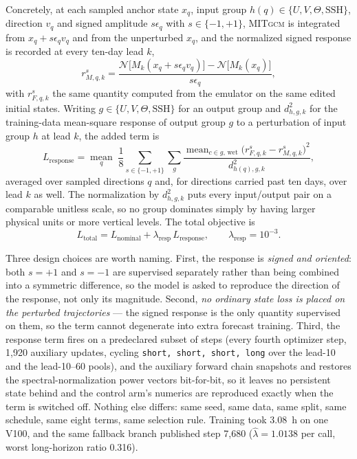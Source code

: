 \documentclass[3p,12pt]{elsarticle}
\newcommand{\MITgcm}{\textsc{MITgcm}}
\begin{document}
Concretely, at each sampled anchor state $x_q$, input group
$h(q)\in\{U,V,\Theta,\mathrm{SSH}\}$, direction $v_q$ and signed amplitude
$s\epsilon_q$ with $s\in\{-1,+1\}$, \MITgcm{} is integrated from
$x_q+s\epsilon_q v_q$ and from the unperturbed $x_q$, and the normalized signed
response is recorded at every ten-day lead $k$,
\begin{equation}
r^{s}_{M,q,k}
=\frac{\mathcal N\bigl[M_k(x_q+s\epsilon_q v_q)\bigr]-\mathcal N\bigl[M_k(x_q)\bigr]}{s\epsilon_q},
\label{eq:response}
\end{equation}
with $r^{s}_{F,q,k}$ the same quantity computed from the emulator on the same
edited initial states. Writing $g\in\{U,V,\Theta,\mathrm{SSH}\}$ for an output
group and $d^{2}_{h,g,k}$ for the training-data mean-square response of output
group $g$ to a perturbation of input group $h$ at lead $k$, the added term is
\begin{equation}
L_{\mathrm{response}}
=\operatorname*{mean}_{q}\;\frac{1}{8}\sum_{s\in\{-1,+1\}}\sum_{g}
\frac{\operatorname{mean}_{c\in g,\,\mathrm{wet}}\bigl(r^{s}_{F,q,k}-r^{s}_{M,q,k}\bigr)^{2}}
{d^{2}_{h(q),g,k}},
\label{eq:lresp}
\end{equation}
averaged over sampled directions $q$ and, for directions carried past ten days,
over lead $k$ as well. The normalization by $d^{2}_{h,g,k}$ puts every
input/output pair on a comparable unitless scale, so no group dominates simply
by having larger physical units or more vertical levels. The total objective is
\begin{equation}
L_{\mathrm{total}} = L_{\mathrm{nominal}} + \lambda_{\mathrm{resp}}\,L_{\mathrm{response}},
\qquad \lambda_{\mathrm{resp}} = 10^{-3}.
\label{eq:ltotal}
\end{equation}

Three design choices are worth naming. First, the response is \emph{signed and
oriented}: both $s=+1$ and $s=-1$ are supervised separately rather than being
combined into a symmetric difference, so the model is asked to reproduce the
direction of the response, not only its magnitude. Second, \emph{no ordinary
state loss is placed on the perturbed trajectories} --- the signed response
is the only quantity supervised on them, so the term cannot degenerate into
extra forecast training. Third, the response term fires on a predeclared subset
of steps (every fourth optimizer step, 1{,}920 auxiliary updates, cycling
\texttt{short, short, short, long} over the lead-10 and the lead-10--60 pools),
and the auxiliary forward chain snapshots and restores the spectral-normalization
power vectors bit-for-bit, so it leaves no persistent state behind and the
control arm's numerics are reproduced exactly when the term is switched off.
Nothing else differs: same seed, same data, same split, same schedule, same
eight terms, same selection rule. Training took 3.08~h on one V100, and the same
fallback branch published step 7{,}680 ($\hat\lambda=1.0138$ per call, worst
long-horizon ratio 0.316).
\end{document}
